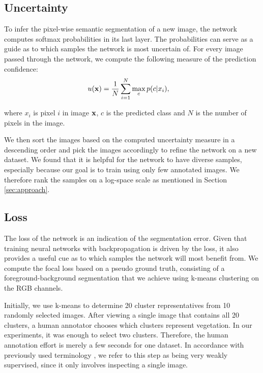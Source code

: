 \documentclass[letterpaper, 10 pt, conference]{ieeeconf}  %
\begin{document}
\subsection{Uncertainty}

To infer the pixel-wise semantic segmentation of a new image, the network computes softmax probabilities in its last layer. The probabilities can serve as a guide as to which samples the network is most uncertain of. For every image passed through the network, we compute the following measure of the prediction confidence:
\begin{align}
u(\bold{x}) &= \frac{1}{N} \sum_{i=1}^N \max_c p(c|x_i),
\end{align}  

where $x_i$ is pixel $i$ in image $\bold{x}$, $c$ is the predicted class and $N$ is the number of pixels in the image.

We then sort the images based on the computed uncertainty measure in a descending order and pick the images accordingly to refine the network on a new dataset. We found that it is helpful for the network to have diverse samples, especially because our goal is to train using only few annotated images. We therefore rank the samples on a log-space scale as mentioned in Section \ref{sec:approach}.


\subsection{Loss} \label{sec:loss}

The loss of the network is an indication of the segmentation error. Given that training neural networks with backpropagation is driven by the loss, it also provides a useful cue as to which samples the network will most benefit from. We compute the focal loss \cite{DBLP:conf/iccv/LinGGHD17} based on a pseudo ground truth, consisting of a foreground-background segmentation that we achieve using k-means clustering on the RGB channels.

Initially, we use k-means to determine 20 cluster representatives from 10 randomly selected images. After viewing a single image that contains all 20 clusters, a human annotator chooses which clusters represent vegetation. In our experiments, it was enough to select two clusters. Therefore, the human annotation effort is merely a few seconds for one dataset. In accordance with previously used terminology \cite{zhang2018self}, we refer to this step as being very weakly supervised, since it only involves inspecting a single image. 
\end{document}
